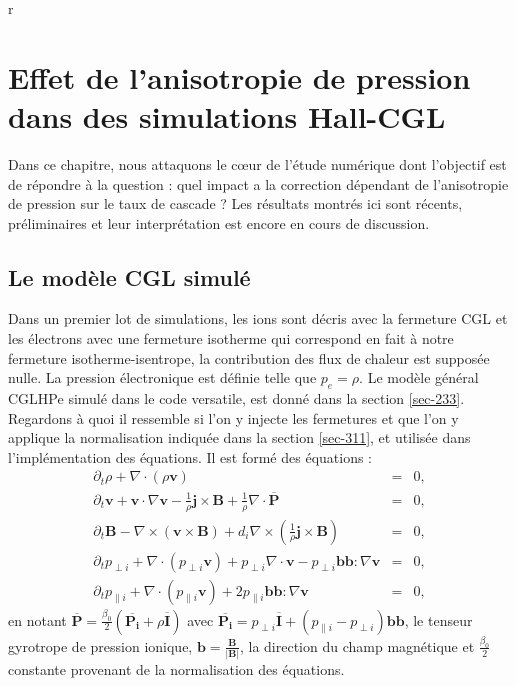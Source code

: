 r\chapter{Effet de l'anisotropie de pression dans des simulations Hall-CGL}
\renewcommand\partie{\Partie\ Chapitre \thechapter}
\label{ch-33}

\minitoc  

Dans ce chapitre, nous attaquons le cœur de l'étude numérique dont l'objectif est de répondre à la question : quel impact a la correction dépendant de l'anisotropie de pression sur le taux de cascade ? Les résultats montrés ici sont récents, préliminaires et leur interprétation est encore en cours de discussion.

\section{Le modèle CGL simulé} \label{sec-331}

Dans un premier lot de simulations, les ions sont décris avec la fermeture CGL et les électrons avec une fermeture isotherme qui correspond en fait à notre fermeture isotherme-isentrope, la contribution des flux de chaleur est supposée nulle. La pression électronique est définie telle que $p_e = \rho$. Le modèle général \acs{CGLHPe} simulé dans le code versatile, est donné dans la section \ref{sec-233}. Regardons à quoi il ressemble si l'on y injecte les fermetures et que l'on y applique la normalisation indiquée dans la section \ref{sec-311}, et utilisée dans l'implémentation des équations. Il est formé des équations :
\begin{eqnarray}
\label{eq:mcgl_r} \partial_t \rho + \nabla \cdot \left(\rho \boldsymbol{v}\right) &=& 0,\\
\label{eq:mcgl_v} \partial_t  \boldsymbol{v} + \boldsymbol{v} \cdot \nabla  \boldsymbol{v} - \frac{1}{\rho} \boldsymbol{j} \times \boldsymbol{B} + \frac{1}{\rho} \nabla \cdot \overline{\boldsymbol{P}}  &=& 0,  \\
\label{eq:mcgl_b} \partial_t \boldsymbol{B} - \nabla \times \left( \boldsymbol{v} \times \boldsymbol{B} \right) +  d_i  \nabla \times \left( \frac{1}{\rho} \boldsymbol{j}\times \boldsymbol{B} \right) &=& 0 , \\
\label{eq:mcgl_pperp} \partial_t  p_{\perp i }  +  \nabla \cdot \left(p_{\perp i } \boldsymbol{v} \right) +  p_{\perp i }\nabla \cdot\boldsymbol{v} -  p_{\perp i } \boldsymbol{b}\boldsymbol{b} : \nabla \boldsymbol{v}  &=& 0  ,\\
\label{eq:mcgl_ppar} \partial_t  p_{\parallel i }  +  \nabla \cdot \left(p_{\parallel i } \boldsymbol{v} \right) +  2 p_{\parallel i }  \boldsymbol{b}\boldsymbol{b} : \nabla \boldsymbol{v}  &=& 0  ,
\end{eqnarray}
en notant $\overline{\boldsymbol{P}} =  \frac{\beta_0}{2} \left(\overline{\boldsymbol{P_i}} + \rho \overline{\boldsymbol{I}} \right)$ avec $\overline{\boldsymbol{P_i}} = p_{\perp i } \overline{\boldsymbol{I}} + \left(p_{\parallel i } - p_{\perp i }\right) \boldsymbol{b} \boldsymbol{b}  $, le tenseur gyrotrope de pression ionique, $\boldsymbol{b} = \frac{\boldsymbol{B}}{|\boldsymbol{B}|}$, la direction du champ magnétique et $\frac{\beta_0}{2} $ constante provenant de la normalisation des équations.

